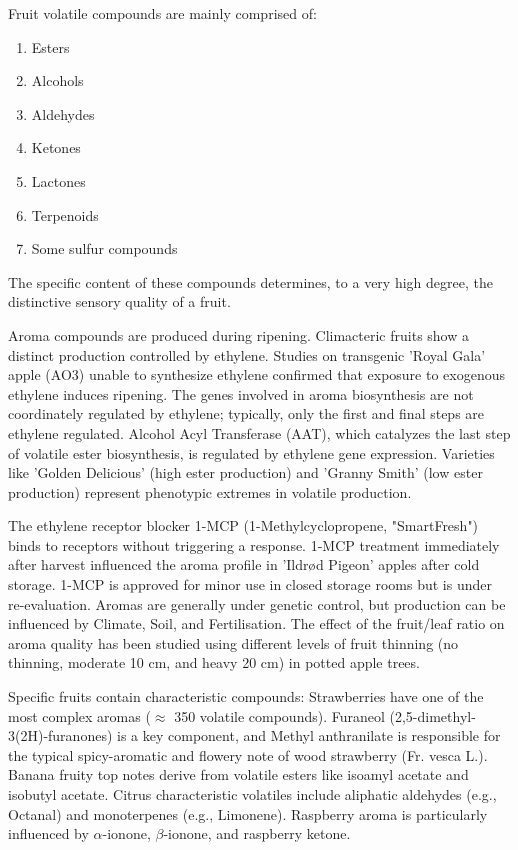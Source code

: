 \vspace{0.5em}
Fruit volatile compounds are mainly comprised of: 

\begin{enumerate} 
    \item Esters 
    \item Alcohols 
    \item Aldehydes 
    \item Ketones 
    \item Lactones 
    \item Terpenoids 
    \item Some sulfur compounds 
\end{enumerate} 

\vspace{0.5em}
The specific content of these compounds determines, to a very high degree, the distinctive sensory quality of a fruit.

\vspace{0.5em}
Aroma compounds are produced during ripening. Climacteric fruits show a distinct production controlled by ethylene. Studies on transgenic 'Royal Gala' apple (AO3) unable to synthesize ethylene confirmed that exposure to exogenous ethylene induces ripening. The genes involved in aroma biosynthesis are not coordinately regulated by ethylene; typically, only the first and final steps are ethylene regulated. Alcohol Acyl Transferase (AAT), which catalyzes the last step of volatile ester biosynthesis, is regulated by ethylene gene expression. Varieties like 'Golden Delicious' (high ester production) and 'Granny Smith' (low ester production) represent phenotypic extremes in volatile production.

\vspace{0.5em}
The ethylene receptor blocker 1-MCP (1-Methylcyclopropene, "SmartFresh") binds to receptors without triggering a response. 1-MCP treatment immediately after harvest influenced the aroma profile in 'Ildrød Pigeon' apples after cold storage. 1-MCP is approved for minor use in closed storage rooms but is under re-evaluation.
Aromas are generally under genetic control, but production can be influenced by Climate, Soil, and Fertilisation. The effect of the fruit/leaf ratio on aroma quality has been studied using different levels of fruit thinning (no thinning, moderate 10 cm, and heavy 20 cm) in potted apple trees.

\vspace{0.5em}
Specific fruits contain characteristic compounds: Strawberries have one of the most complex aromas ($\approx$ 350 volatile compounds). Furaneol (2,5-dimethyl-3(2H)-furanones) is a key component, and Methyl anthranilate is responsible for the typical spicy-aromatic and flowery note of wood strawberry (Fr. vesca L.). Banana fruity top notes derive from volatile esters like isoamyl acetate and isobutyl acetate. Citrus characteristic volatiles include aliphatic aldehydes (e.g., Octanal) and monoterpenes (e.g., Limonene). Raspberry aroma is particularly influenced by $\alpha$-ionone, $\beta$-ionone, and raspberry ketone.


